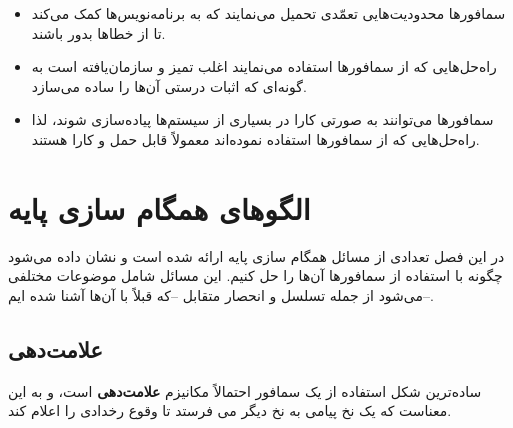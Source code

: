 \documentclass{book}
\newcommand{\clearemptydoublepage}{\newpage\cleardoublepage}
\begin{document}
\begin{itemize}

\item 
    سمافورها محدودیت‌هایی تعمّدی تحمیل می‌نمایند که به برنامه‌نویس‌ها کمک می‌کند تا از خطاها بدور باشند. 

\item 
    راه‌حل‌هایی که از سمافورها استفاده می‌نمایند اغلب تمیز و سازمان‌یافته است به گونه‌ای که اثبات درستی آن‌ها را ساده می‌سازد. 

\item 
    سمافورها می‌توانند به صورتی کارا در بسیاری از سیستم‌ها پیاده‌سازی شوند، لذا راه‌حل‌هایی که از سمافورها استفاده نموده‌اند معمولاً قابل حمل 
    و کارا هستند. 
\end{itemize}

\clearemptydoublepage

\chapter{الگوهای همگام سازی پایه}

در این فصل تعدادی از مسائل همگام سازی پایه ارائه شده است و نشان داده می‌شود چگونه با استفاده از سمافورها آن‌ها را حل کنیم. این مسائل شامل موضوعات مختلفی می‌شود از جمله تسلسل و انحصار متقابل --که قبلاً با آن‌ها آشنا شده ایم--.

\section{علامت‌دهی}

ساده‌ترین شکل استفاده از یک سمافور احتمالاً مکانیزم \textbf{علامت‌دهی}  است، 
و به این معناست که یک نخ%
پیامی به نخ دیگر می فرستد تا وقوع رخدادی را اعلام کند.
\end{document}
